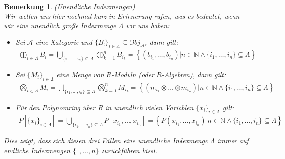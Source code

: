\documentclass[10pt,a4paper]{report}
\newcounter{Aussage}[chapter]
\newtheorem{bem}[Aussage]{Bemerkung}
\begin{document}
\ \\
\begin{bem}\label{Unendliche Indexmengen}(Unendliche Indexmengen)\\
Wir wollen uns hier nochmal kurz in Erinnerung rufen, was es bedeutet, wenn wir eine unendlich große Indexmenge $\Lambda$ vor uns haben:
\begin{itemize}
\item[1.] Sei $\mathcal{A}$ eine Kategorie und $\lbrace B_i \rbrace_{i \in \Lambda} \subseteq Obj_{\mathcal{A}}$, dann gilt:
\begin{gather*}
\bigoplus_{i \in \Lambda} B_i 
= \bigcup_{\lbrace i_1, \dots, i_n \rbrace \subseteq \Lambda} \bigoplus_{k = 1}^{n} B_{i_k} 
= \left\lbrace (b_{i_1}, \dots , b_{i_n}) \vert n \in \mathbb{N} \wedge \lbrace i_1, \dots ,i_n \rbrace \subseteq \Lambda \right\rbrace
\end{gather*}
\item[2.] Sei $\lbrace M_i \rbrace_{i \in \Lambda}$ eine Menge von $R$-Moduln (oder $R$-Algebren), dann gilt:
\begin{gather*}
\bigotimes_{i \in \Lambda} M_i 
= \bigcup_{\lbrace i_1, \dots, i_n \rbrace \subseteq \Lambda} \bigotimes_{k = 1}^{n} M_{i_k} 
= \left\lbrace (m_{i_1} \otimes \dots \otimes m_{i_n}) \vert n \in \mathbb{N} \wedge \lbrace i_1, \dots ,i_n \rbrace \subseteq \Lambda \right\rbrace
\end{gather*}
\item[3.] Für den Polynomring über $R$ in unendlich vielen Variablen $\lbrace x_i \rbrace_{i \in \Lambda}$ gilt:
\begin{gather*}
P[\lbrace x_i \rbrace_{i \in \Lambda}] 
= \bigcup_{\lbrace i_1, \dots, i_n \rbrace \subseteq \Lambda} P[x_{i_1} , \dots , x_{i_n}] 
= \left\lbrace P(x_{i_1}, \dots , x_{i_n}) \vert n \in \mathbb{N} \wedge \lbrace i_1, \dots ,i_n \rbrace \subseteq \Lambda \right\rbrace
\end{gather*}
\end{itemize}
Dies zeigt, dass sich diesen drei Fällen eine unendliche Indexmenge $\Lambda$ immer auf endliche Indexmengen $\lbrace 1, \dots , n\rbrace$ zurückführen lässt.
\end{bem}
\end{document}
